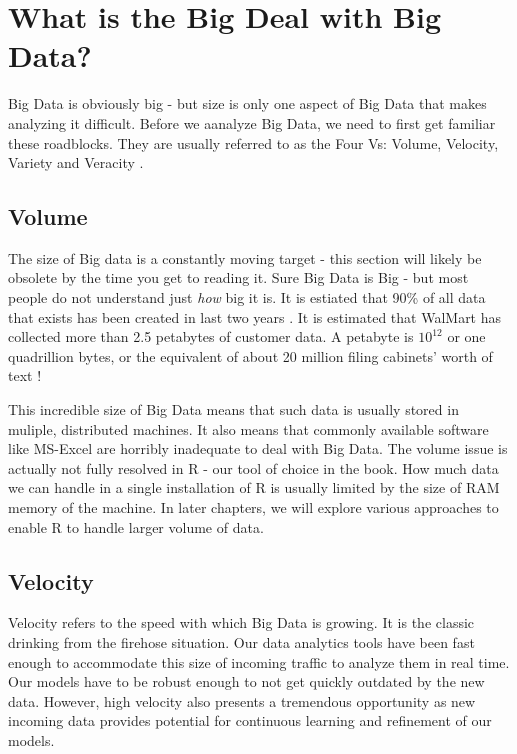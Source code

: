 \documentclass[11pt, letterpaper, twoside]{memoir}\usepackage{knitr}
\begin{document}
\section{What is the Big Deal with Big Data?}

Big Data is obviously big - but size is only one aspect of Big Data that makes analyzing it difficult. Before we aanalyze Big Data, we need to first get familiar these roadblocks. They are usually referred to as the Four Vs: Volume, Velocity, Variety and Veracity \citep{Infograp69:online}.

\subsection{Volume}

The size of Big data is a constantly moving target - this section will likely be obsolete by the time you get to reading it. Sure Big Data is Big - but most people do not understand just \emph{how} big it is. It is estiated that 90\% of all data that exists has been created in last two years \citep{IBMWhati26:online}. It is estimated that WalMart has collected more than 2.5  petabytes of customer data. A petabyte is $10 ^ {12}$ or one quadrillion bytes, or the equivalent of about 20 million filing cabinets' worth of text \citep{mcafee2012big}!

This incredible size of Big Data means that such data is usually stored in muliple, distributed machines. It also means that commonly available software like MS-Excel are horribly inadequate to deal with Big Data. The volume issue is actually not fully resolved in R - our tool of choice in the book. How much data we can handle in a single installation of R is usually limited by the size of RAM memory of the machine. In later chapters, we will explore various approaches to enable R to handle larger volume of data.

\subsection{Velocity}

Velocity refers to the speed with which Big Data is growing. It is the classic drinking from the firehose situation. Our data analytics tools have been fast enough to accommodate this size of incoming traffic to analyze them in real time. Our models have to be robust enough to not get quickly outdated by the new data. However, high velocity also presents a tremendous opportunity as new incoming data provides potential for continuous learning and refinement of our models.
\end{document}
